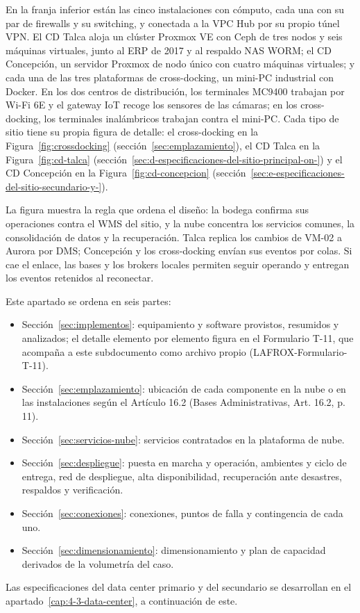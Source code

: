 En la franja inferior están las cinco instalaciones con cómputo, cada una con su par de firewalls y su switching, y conectada a la VPC Hub por su propio túnel VPN. El CD Talca aloja un clúster Proxmox VE con Ceph de tres nodos y seis máquinas virtuales, junto al ERP de 2017 y al respaldo NAS WORM; el CD Concepción, un servidor Proxmox de nodo único con cuatro máquinas virtuales; y cada una de las tres plataformas de cross-docking, un mini-PC industrial con Docker. En los dos centros de distribución, los terminales MC9400 trabajan por Wi-Fi 6E y el gateway IoT recoge los sensores de las cámaras; en los cross-docking, los terminales inalámbricos trabajan contra el mini-PC. Cada tipo de sitio tiene su propia figura de detalle: el cross-docking en la Figura~\ref{fig:crossdocking} (sección~\ref{sec:emplazamiento}), el CD Talca en la Figura~\ref{fig:cd-talca} (sección~\ref{sec:d-especificaciones-del-sitio-principal-on-}) y el CD Concepción en la Figura~\ref{fig:cd-concepcion} (sección~\ref{sec:e-especificaciones-del-sitio-secundario-y-}).

La figura muestra la regla que ordena el diseño: la bodega confirma sus operaciones contra el WMS del sitio, y la nube concentra los servicios comunes, la consolidación de datos y la recuperación. Talca replica los cambios de VM-02 a Aurora por DMS; Concepción y los cross-docking envían sus eventos por colas. Si cae el enlace, las bases y los brokers locales permiten seguir operando y entregan los eventos retenidos al reconectar.

Este apartado se ordena en seis partes:

\begin{itemize}
  \item Sección~\ref{sec:implementos}: equipamiento y software provistos, resumidos y analizados; el detalle elemento por elemento figura en el Formulario T-11, que acompaña a este subdocumento como archivo propio (LAFROX-Formulario-T-11).
  \item Sección~\ref{sec:emplazamiento}: ubicación de cada componente en la nube o en las instalaciones según el Artículo 16.2 (Bases Administrativas, Art. 16.2, p. 11).
  \item Sección~\ref{sec:servicios-nube}: servicios contratados en la plataforma de nube.
  \item Sección~\ref{sec:despliegue}: puesta en marcha y operación, ambientes y ciclo de entrega, red de despliegue, alta disponibilidad, recuperación ante desastres, respaldos y verificación.
  \item Sección~\ref{sec:conexiones}: conexiones, puntos de falla y contingencia de cada uno.
  \item Sección~\ref{sec:dimensionamiento}: dimensionamiento y plan de capacidad derivados de la volumetría del caso.
\end{itemize}

Las especificaciones del data center primario y del secundario se desarrollan en el apartado~\ref{cap:4-3-data-center}, a continuación de este.
